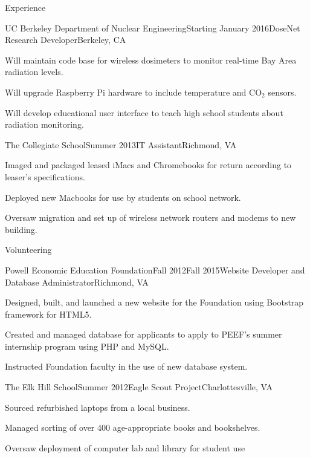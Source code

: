 \documentclass{resume} %
\begin{document}
\begin{rSection}{Experience}
\begin{rSubsection}{UC Berkeley Department of Nuclear Engineering}{Starting January 2016}{DoseNet Research Developer}{Berkeley, CA}
\item Will maintain code base for wireless dosimeters to monitor real-time Bay Area radiation levels.
\item Will upgrade Raspberry Pi hardware to include temperature and CO$_2$ sensors. 
\item Will develop educational user interface to teach high school students about radiation monitoring.
\end{rSubsection}
\begin{rSubsection}{The Collegiate School}{Summer 2013}{IT Assistant}{Richmond, VA}
\item Imaged and packaged leased iMacs and Chromebooks for return according to leaser's specifications.
\item Deployed new Macbooks for use by students on school network.
\item Oversaw migration and set up of wireless network routers and modems to new building.
\end{rSubsection}
\end{rSection}


\begin{rSection}{Volunteering}

\begin{rSubsection}{Powell Economic Education Foundation}{Fall 2012\textminus Fall 2015}{Website Developer and Database Administrator}{Richmond, VA}
\item Designed, built, and launched a new website for the Foundation using Bootstrap framework for HTML5.
\item Created and managed database for applicants to apply to PEEF's summer internship program using PHP and MySQL.
\item Instructed Foundation faculty in the use of new database system.
\end{rSubsection}
\begin{rSubsection}{The Elk Hill School}{Summer 2012}{Eagle Scout Project}{Charlottesville, VA}
\item Sourced refurbished laptops from a local business.
\item Managed sorting of over 400 age-appropriate books and bookshelves.
\item Oversaw deployment of computer lab and library for student use
\end{rSubsection}
\end{rSection}
\end{document}
